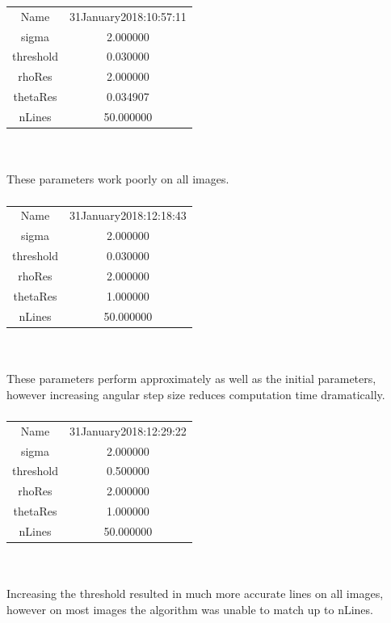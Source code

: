 \documentclass[12pt]{article}
\begin{document}
\subsubsection{}
\begin{tabular} { c c }
Name  &  31January2018:10:57:11 \\
sigma  &  2.000000 \\
threshold  &  0.030000 \\
rhoRes & 2.000000 \\
thetaRes & 0.034907 \\
nLines & 50.000000 
\end{tabular}
\\ \\
These parameters work poorly on all images.

\subsubsection{}
\begin{tabular} { c c }
Name & 31January2018:12:18:43\\
sigma & 2.000000\\
threshold & 0.030000\\
rhoRes & 2.000000\\
thetaRes & 1.000000\\
nLines & 50.000000
\end{tabular}
\\ \\
These parameters perform approximately as well as the initial parameters, however increasing angular step size reduces computation time dramatically.

\subsubsection{}
\begin{tabular} { c c }
Name & 31January2018:12:29:22\\
sigma & 2.000000\\
threshold & 0.500000\\
rhoRes & 2.000000\\
thetaRes & 1.000000\\
nLines & 50.000000
\end{tabular}
\\ \\
Increasing the threshold resulted in much more accurate lines on all images, however on most images the algorithm was unable to match up to nLines.
\end{document}
